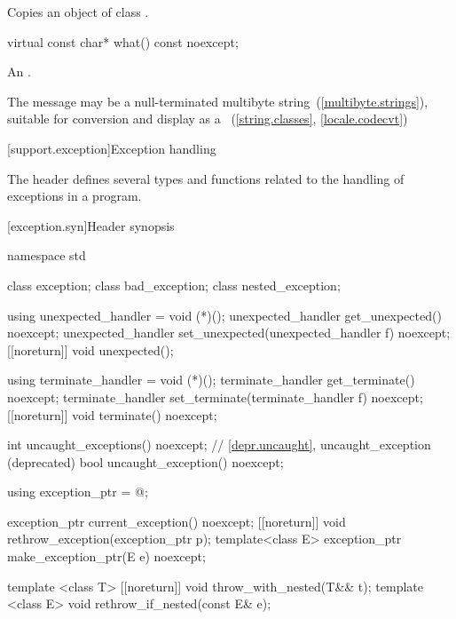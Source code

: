 \begin{itemdescr}
\pnum
\effects
Copies an object of class
.
\end{itemdescr}

%
\begin{itemdecl}
virtual const char* what() const noexcept;
\end{itemdecl}

\begin{itemdescr}
\pnum
\returns
An  \ntbs.%

\pnum
\remarks
The message may be a null-terminated multibyte string~(\ref{multibyte.strings}),
suitable for conversion and display as a
~(\ref{string.classes}, \ref{locale.codecvt})
\end{itemdescr}

[support.exception]{Exception handling}

\pnum
The header
defines several types and functions related to the handling of exceptions in a \Cpp program.

[exception.syn]{Header  synopsis}
%
%

\begin{codeblock}
namespace std {
  class exception;
  class bad_exception;
  class nested_exception;

  using unexpected_handler = void (*)();
  unexpected_handler get_unexpected() noexcept;
  unexpected_handler set_unexpected(unexpected_handler f) noexcept;
  [[noreturn]] void unexpected();

  using terminate_handler = void (*)();
  terminate_handler get_terminate() noexcept;
  terminate_handler set_terminate(terminate_handler f) noexcept;
  [[noreturn]] void terminate() noexcept;

  int uncaught_exceptions() noexcept;
  // \ref{depr.uncaught}, uncaught_exception (deprecated)
  bool uncaught_exception() noexcept;

  using exception_ptr = @\unspec@;

  exception_ptr current_exception() noexcept;
  [[noreturn]] void rethrow_exception(exception_ptr p);
  template<class E> exception_ptr make_exception_ptr(E e) noexcept;

  template <class T> [[noreturn]] void throw_with_nested(T&& t);
  template <class E> void rethrow_if_nested(const E& e);
}
\end{codeblock}

